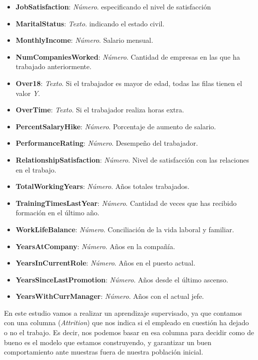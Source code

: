 \begin{itemize}
\item \textbf{JobSatisfaction}: \textit{Número}. especificando el nivel de satisfacción
\item \textbf{MaritalStatus}: \textit{Texto}. indicando el estado civil.
\item \textbf{MonthlyIncome}: \textit{Número}. Salario mensual.
\item \textbf{NumCompaniesWorked}: \textit{Número}. Cantidad de empresas en las que ha trabajado anteriormente.
\item \textbf{Over18}: \textit{Texto}. Si el trabajador es mayor de edad, todas las filas tienen el valor \textit{Y}.
\item \textbf{OverTime}: \textit{Texto}. Si el trabajador realiza horas extra.
\item \textbf{PercentSalaryHike}: \textit{Número}. Porcentaje de aumento de salario.
\item \textbf{PerformanceRating}: \textit{Número}. Desempeño del trabajador.
\item \textbf{RelationshipSatisfaction}: \textit{Número}. Nivel de satisfacción con las relaciones en el trabajo.
\item \textbf{TotalWorkingYears}: \textit{Número}. Años totales trabajados.
\item \textbf{TrainingTimesLastYear}: \textit{Número}. Cantidad de veces que has recibido formación en el último año.
\item \textbf{WorkLifeBalance}: \textit{Número}. Conciliación de la vida laboral y familiar.
\item \textbf{YearsAtCompany}: \textit{Número}. Años en la compañía.
\item \textbf{YearsInCurrentRole}: \textit{Número}. Años en el puesto actual.
\item \textbf{YearsSinceLastPromotion}: \textit{Número}. Años desde el último ascenso.
\item \textbf{YearsWithCurrManager}: \textit{Número}. Años con el actual jefe.

\end{itemize}



En este estudio vamos a realizar un aprendizaje supervisado, ya que contamos con una columna (\textit{Attrition}) que nos indica si el empleado en cuestión ha dejado o no el trabajo.
Es decir, nos podemos basar en esa columna para decidir como de bueno es el modelo que estamos construyendo, y garantizar un buen comportamiento ante muestras fuera de nuestra población inicial.\\


